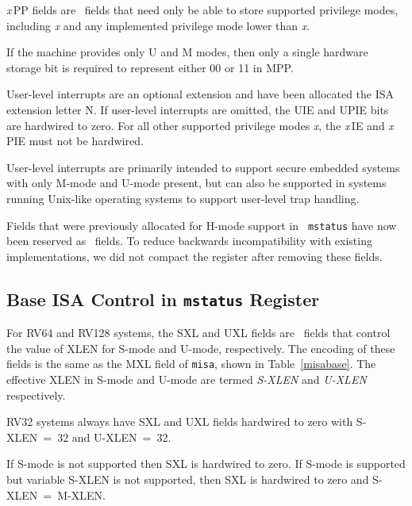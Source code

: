 {\em x}\,PP fields are \wlrl\ fields that need only be able to store
supported privilege modes, including {\em x} and any implemented
privilege mode lower than {\em x}.

\begin{commentary}
If the machine provides only U and M modes, then only a single
hardware storage bit is required to represent either 00 or 11 in MPP.
\end{commentary}

User-level interrupts are an optional extension and have been
allocated the ISA extension letter N.
If user-level interrupts are omitted, the
UIE and UPIE bits are hardwired to zero.  For all other supported
privilege modes {\em x}, the {\em x}\,IE and {\em x}\,PIE must not
be hardwired.

\begin{commentary}
User-level interrupts are primarily intended to support secure
embedded systems with only M-mode and U-mode present, but can also be
supported in systems running Unix-like operating systems to support
user-level trap handling.
\end{commentary}

\begin{commentary}
Fields that were previously allocated for H-mode support in {\tt
  mstatus} have now been reserved as \wpri\ fields.  To reduce
backwards incompatibility with existing implementations, we did not
compact the register after removing these fields.
\end{commentary}

\subsection{Base ISA Control in {\tt mstatus} Register}

For RV64 and RV128 systems, the SXL and UXL fields are \warl\ fields
that control the value of XLEN for S-mode and U-mode,
respectively. The encoding of these fields is the same as the MXL
field of {\tt misa}, shown in Table~\ref{misabase}.  The effective
XLEN in S-mode and U-mode are termed {\em S-XLEN} and {\em U-XLEN}
respectively.

RV32 systems always have SXL and UXL fields hardwired to zero with
S-XLEN~=~32 and U-XLEN~=~32.

If S-mode is not supported then SXL is hardwired to zero.  If S-mode
is supported but variable S-XLEN is not supported, then SXL is
hardwired to zero and S-XLEN~=~M-XLEN.


